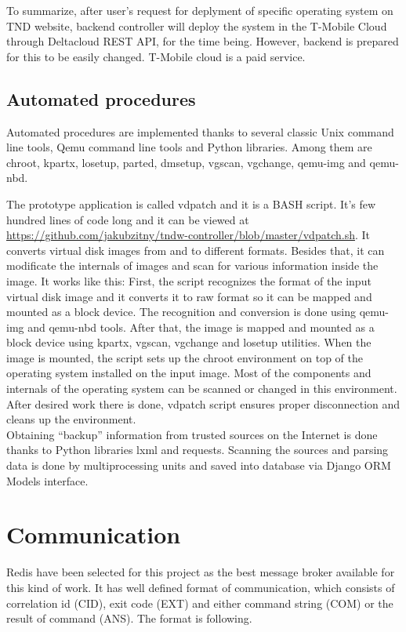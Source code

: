 \documentclass[thesis=B,english]{FITthesis}[2013/04/26]
\begin{document}
To summarize, after user's request for deplyment of specific operating system on TND website, backend controller will deploy the system in the T-Mobile Cloud through Deltacloud REST API, for the time being. However, backend is prepared for this to be easily changed. T-Mobile cloud is a paid service.

\subsection{Automated procedures}

Automated procedures are implemented thanks to several classic Unix command line tools, Qemu command line tools and Python libraries. Among them are chroot, kpartx, losetup, parted, dmsetup, vgscan, vgchange, qemu-img and qemu-nbd.

The prototype application is called vdpatch and it is a BASH script. It's few hundred lines of code long and it can be viewed at \url{https://github.com/jakubzitny/tndw-controller/blob/master/vdpatch.sh}. It converts virtual disk images from and to different formats. Besides that, it can modificate the internals of images and scan for various information inside the image. It works like this: First, the script recognizes the format of the input virtual disk image and it converts it to raw format so it can be mapped and mounted as a block device. The recognition and conversion is done using qemu-img and qemu-nbd tools. After that, the image is mapped and mounted as a block device using kpartx, vgscan, vgchange and losetup utilities. When the image is mounted, the script sets up the chroot environment on top of the operating system installed on the input image. Most of the components and internals of the operating system can be scanned or changed in this environment. After desired work there is done, vdpatch script ensures proper disconnection and cleans up the environment. \\

Obtaining ``backup'' information from trusted sources on the Internet is done thanks to Python libraries lxml and requests. Scanning the sources and parsing data is done by multiprocessing units and saved into database via Django ORM Models interface.

\section{Communication}

Redis have been selected for this project as the best message broker available for this kind of work. It has well defined format of communication, which consists of correlation id (CID), exit code (EXT) and either command string (COM) or the result of command (ANS). The format is following.
\end{document}
